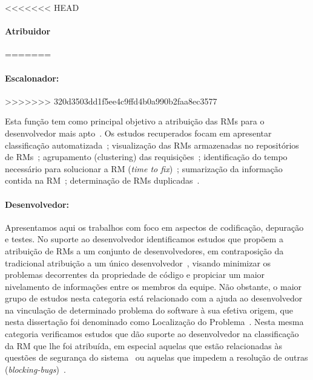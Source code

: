 

<<<<<<< HEAD
\paragraph{Atribuidor}
=======
\paragraph{Escalonador:}
>>>>>>> 320d3503dd1f5ee4c9ffd4b0a990b2faa8ec3577

Esta função tem como principal objetivo a atribuição das RMs para o
desenvolvedor mais apto~\cite{banitaan2013decoba}.  Os estudos recuperados
focam em apresentar classificação
automatizada~\cite{gegick2010identifying,liu2014faceted, behl2014bug,
    chawla2015automated,tian2015automated}; visualização das RMs armazenadas no
repositórios de RMs~\cite{izquierdo2015gila}; agrupamento (clustering) das
requisições~\cite{liu2014faceted}; identificação do tempo necessário para
solucionar a RM (\textit{time to fix})~\cite{hosseini2012market,
    Bhattacharya:2011:BTP:1985441.1985472}; sumarização da informação contida
na RM~\cite{mani2012ausum}; determinação de RMs duplicadas~\cite{Sun2011,
    Wu2011a}.

\paragraph{Desenvolvedor:}

Apresentamos aqui os trabalhos com foco em aspectos de co\-di\-fi\-ca\-ção,
depuração e testes. No suporte ao desenvolvedor identificamos estudos que
propõem a atribuição de RMs a um conjunto de desenvolvedores, em contraposição
da tradicional atribuição a um único desenvolvedor~\cite{banitaan2013decoba},
visando minimizar os pro\-ble\-mas decorrentes da propriedade de código e
propiciar um maior nivelamento de informações entre os membros da equipe. Não
obstante, o maior grupo de estudos nesta categoria está relacionado com a ajuda
ao desenvolvedor na vinculação de determinado problema do software à sua efetiva
origem, que nesta dissertação foi denominado como Localização do
Problema~\cite{corley2011recovering,Wong:2014:BBF:2705615.2706096,
    Thung:2014:BIT:2635868.2661678,Nguyen:2012:MAR:2393596.2393671,thung2013automatic,
    Romo:2015:TAT:2745802.2745833}. Nesta mesma categoria verificamos estudos
que dão suporte ao desenvolvedor na classificação da RM que lhe foi atribuída,
em especial aquelas que estão relacionadas às questões de segurança do
sistema~\cite{gegick2010identifying} ou aquelas que impedem a resolução de
outras (\textit{blocking-bugs})~\cite{ValdiviaGarcia:2014:CPB:2597073.2597099}.

